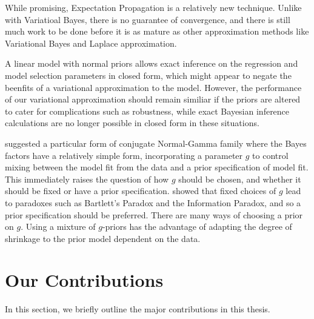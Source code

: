 While promising, Expectation Propagation is a relatively new technique.
Unlike with Variatioal Bayes, there is no guarantee of convergence, and there is still much work to be done
before it is as mature as other approximation methods like Variational Bayes and Laplace approximation.

A linear model with normal priors allows exact inference on the regression and model selection parameters in
closed form, which might appear to negate the beenfits of a variational approximation to the model. However,
the performance of our variational approximation should remain similiar if the priors are altered to cater for
complications such as robustness, while exact Bayesian inference calculations are no longer possible in closed
form in these situations.

\cite{Zellner1986} suggested a particular form of conjugate Normal-Gamma family where the Bayes factors have a
relatively simple form, incorporating a parameter $g$ to control mixing between the model fit from the data
and a prior specification of model fit. This immediately raises the question of how $g$ should be chosen, and
whether it should be fixed or have a prior specification. \cite{Liang2008} showed that fixed choices of $g$
lead to paradoxes such as Bartlett's Paradox and the Information Paradox, and so a prior specification should
be preferred. There are many ways of choosing a prior on $g$. Using a mixture of $g$-priors has the advantage
of adapting the degree of shrinkage to the prior model dependent on the data.

\section{Our Contributions}

In this section, we briefly outline the major contributions in this thesis.

